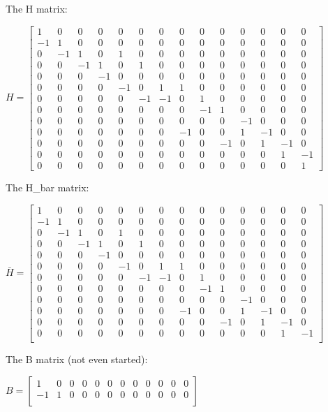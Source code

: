 The H matrix:

$ H = \begin{bmatrix}
	1	& 0 	& 0 	& 0 	& 0 	& 0 	& 0 	& 0 	& 0 	& 0 	& 0 	& 0 	& 0 	& 0 \\
	-1	& 1 	& 0 	& 0 	& 0 	& 0 	& 0 	& 0 	& 0 	& 0 	& 0 	& 0 	& 0 	& 0 \\
	0	& -1 	& 1 	& 0 	& 1 	& 0 	& 0 	& 0 	& 0 	& 0 	& 0 	& 0 	& 0 	& 0 \\
	0	& 0 	& -1 	& 1 	& 0 	& 1 	& 0 	& 0 	& 0 	& 0 	& 0 	& 0 	& 0 	& 0 \\
	0	& 0 	& 0 	& -1 	& 0 	& 0 	& 0 	& 0 	& 0 	& 0 	& 0 	& 0 	& 0 	& 0 \\
	0	& 0 	& 0 	& 0 	& -1 	& 0 	& 1 	& 1 	& 0 	& 0 	& 0 	& 0 	& 0 	& 0 \\
	0	& 0 	& 0 	& 0 	& 0 	& -1 	& -1 	& 0 	& 1 	& 0 	& 0 	& 0 	& 0 	& 0 \\
	0	& 0 	& 0 	& 0 	& 0 	& 0 	& 0 	& 0 	& -1 	& 1 	& 0 	& 0 	& 0 	& 0 \\
	0	& 0 	& 0 	& 0 	& 0 	& 0 	& 0 	& 0 	& 0 	& 0 	& -1 	& 0 	& 0 	& 0 \\
	0	& 0 	& 0 	& 0 	& 0 	& 0 	& 0 	& -1 	& 0 	& 0 	& 1 	& -1 	& 0 	& 0 \\
	0	& 0 	& 0 	& 0 	& 0 	& 0 	& 0 	& 0 	& 0 	& -1 	& 0 	& 1 	& -1 	& 0 \\
	0	& 0 	& 0 	& 0 	& 0 	& 0 	& 0 	& 0 	& 0 	& 0 	& 0 	& 0 	& 1 	& -1\\
	0	& 0 	& 0 	& 0 	& 0 	& 0 	& 0 	& 0 	& 0 	& 0 	& 0 	& 0 	& 0 	& 1    
\end{bmatrix}  $

The H\_bar matrix:

$ \bar{H} = \begin{bmatrix}
	1	& 0 	& 0 	& 0 	& 0 	& 0 	& 0 	& 0 	& 0 	& 0 	& 0 	& 0 	& 0 	& 0 \\
	-1	& 1 	& 0 	& 0 	& 0 	& 0 	& 0 	& 0 	& 0 	& 0 	& 0 	& 0 	& 0 	& 0 \\
	0	& -1 	& 1 	& 0 	& 1 	& 0 	& 0 	& 0 	& 0 	& 0 	& 0 	& 0 	& 0 	& 0 \\
	0	& 0 	& -1 	& 1 	& 0 	& 1 	& 0 	& 0 	& 0 	& 0 	& 0 	& 0 	& 0 	& 0 \\
	0	& 0 	& 0 	& -1 	& 0 	& 0 	& 0 	& 0 	& 0 	& 0 	& 0 	& 0 	& 0 	& 0 \\
	0	& 0 	& 0 	& 0 	& -1 	& 0 	& 1 	& 1 	& 0 	& 0 	& 0 	& 0 	& 0 	& 0 \\
	0	& 0 	& 0 	& 0 	& 0 	& -1 	& -1 	& 0 	& 1 	& 0 	& 0 	& 0 	& 0 	& 0 \\
	0	& 0 	& 0 	& 0 	& 0 	& 0 	& 0 	& 0 	& -1 	& 1 	& 0 	& 0 	& 0 	& 0 \\
	0	& 0 	& 0 	& 0 	& 0 	& 0 	& 0 	& 0 	& 0 	& 0 	& -1 	& 0 	& 0 	& 0 \\
	0	& 0 	& 0 	& 0 	& 0 	& 0 	& 0 	& -1 	& 0 	& 0 	& 1 	& -1 	& 0 	& 0 \\
	0	& 0 	& 0 	& 0 	& 0 	& 0 	& 0 	& 0 	& 0 	& -1 	& 0 	& 1 	& -1 	& 0 \\
	0	& 0 	& 0 	& 0 	& 0 	& 0 	& 0 	& 0 	& 0 	& 0 	& 0 	& 0 	& 1 	& -1\\
\end{bmatrix}  $

The B matrix (not even started):

$ B = \begin{bmatrix}
	1	& 0 	& 0 	& 0 	& 0 	& 0 	& 0 	& 0 	& 0 	& 0 	& 0 	& 0 \\
	-1	& 1 	& 0 	& 0 	& 0 	& 0 	& 0 	& 0 	& 0 	& 0 	& 0 	& 0 \\
\end{bmatrix}  $

